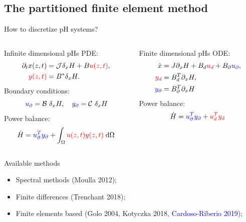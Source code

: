 \documentclass[aspectratio=169]{ISAE-Beamer}
\begin{document}
\subsection{The partitioned finite element method}

\begin{frame}{How to discretize pH systems?}
\begin{columns}[T]
	\setlength{\abovedisplayskip}{1pt}
	\setlength{\belowdisplayskip}{1pt}
	\begin{column}{.4\textwidth}
		\begin{block}{Infinite dimensional pHs}
			PDE:
			\begin{align*}
			\partial_t{x}(z, t) &= \mathcal{J} \delta_x {H} + B \textcolor{red}{u(z, t)}, \\
			\textcolor{red}{y(z, t)} &= B^* \delta_x {H}.
			\end{align*}
			Boundary conditions: 
			\[\textcolor{blue}{u_\partial} = \mathcal{B}\ \delta_x {H}, \quad \textcolor{blue}{y_\partial} = \mathcal{C}\ \delta_x {H} \]
			Power balance: 
			\[ \dot{H} = \displaystyle \textcolor{blue}{u_\partial^T y_\partial} +  \int_{\Omega} \textcolor{red}{u(z, t) y(z, t)} \d{\Omega}
			\]
		\end{block}
	\end{column}
	\begin{column}{.4\textwidth}
		\begin{block}{Finite dimensional pHs}
			ODE:
			\begin{align*}
			\dot{x} &= J \partial_x {H} + B_d \textcolor{red}{u_d} + B_\partial \textcolor{blue}{u_\partial}, \\
			\textcolor{red}{y_d} &= B_d^T \partial_x {H}, \\
			\textcolor{blue}{y_\partial} &= B_\partial^T \partial_x {H}
			\end{align*}
			Power balance: 
			\[ \dot{H} = \textcolor{blue}{u_\partial^T y_\partial} +  \textcolor{red}{u_d^T y_d}
			\]
		\end{block}
	\end{column}
\end{columns}
\begin{exampleblock}{Available methods}
	\begin{itemize}
		\item Spectral methods (Moulla 2012);
		\item Finite differences (Trenchant 2018);
		\item Finite elements based (Golo 2004, Kotyczka 2018, \textcolor{blue}{Cardoso-Riberio 2019});
	\end{itemize}
\end{exampleblock}
\end{frame}
\end{document}
